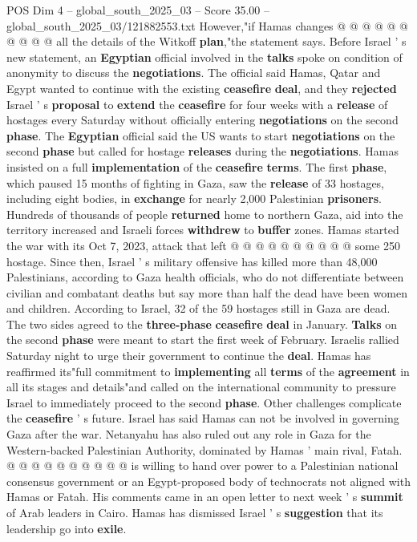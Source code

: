 \begin{textsample}{POS Dim 4 – global\_south\_2025\_03 – Score 35.00 – global\_south\_2025\_03/121882553.txt}
However,"if Hamas changes @ @ @ @ @ @ @ @ @ @ all the details of the Witkoff \textbf{plan},"the statement says.
Before Israel ' s new statement, an \textbf{Egyptian} official involved in the \textbf{talks} spoke on condition of anonymity to discuss the \textbf{negotiations}.
The official said Hamas, Qatar and Egypt wanted to continue with the existing \textbf{ceasefire} \textbf{deal}, and they \textbf{rejected} Israel ' s \textbf{proposal} to \textbf{extend} the \textbf{ceasefire} for four weeks with a \textbf{release} of hostages every Saturday without officially entering \textbf{negotiations} on the second \textbf{phase}.
The \textbf{Egyptian} official said the US wants to start \textbf{negotiations} on the second \textbf{phase} but called for hostage \textbf{releases} during the \textbf{negotiations}.
Hamas insisted on a full \textbf{implementation} of the \textbf{ceasefire} \textbf{terms}.
The first \textbf{phase}, which paused 15 months of fighting in Gaza, saw the \textbf{release} of 33 hostages, including eight bodies, in \textbf{exchange} for nearly 2,000 Palestinian \textbf{prisoners}.
Hundreds of thousands of people \textbf{returned} home to northern Gaza, aid into the territory increased and Israeli forces \textbf{withdrew} to \textbf{buffer} zones.
Hamas started the war with its Oct 7, 2023, attack that left @ @ @ @ @ @ @ @ @ @ some 250 hostage.
Since then, Israel ' s military offensive has killed more than 48,000 Palestinians, according to Gaza health officials, who do not differentiate between civilian and combatant deaths but say more than half the dead have been women and children.
According to Israel, 32 of the 59 hostages still in Gaza are dead.
The two sides agreed to the \textbf{three-phase} \textbf{ceasefire} \textbf{deal} in January. \textbf{Talks} on the second \textbf{phase} were meant to start the first week of February.
Israelis rallied Saturday night to urge their government to continue the \textbf{deal}.
Hamas has reaffirmed its"full commitment to \textbf{implementing} all \textbf{terms} of the \textbf{agreement} in all its stages and details"and called on the international community to pressure Israel to immediately proceed to the second \textbf{phase}.
Other challenges complicate the \textbf{ceasefire} ' s future.
Israel has said Hamas can not be involved in governing Gaza after the war.
Netanyahu has also ruled out any role in Gaza for the Western-backed Palestinian Authority, dominated by Hamas ' main rival, Fatah. @ @ @ @ @ @ @ @ @ @ is willing to hand over power to a Palestinian national consensus government or an Egypt-proposed body of technocrats not aligned with Hamas or Fatah.
His comments came in an open letter to next week ' s \textbf{summit} of Arab leaders in Cairo.
Hamas has dismissed Israel ' s \textbf{suggestion} that its leadership go into \textbf{exile}.


\end{textsample}

